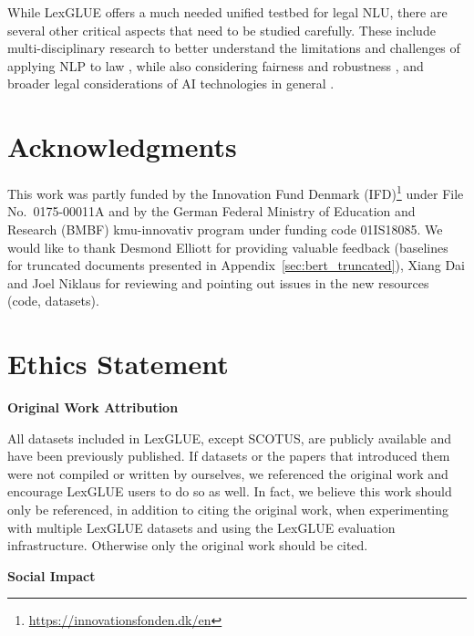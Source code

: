 \documentclass[11pt]{article}
\begin{document}
While LexGLUE offers a much needed unified testbed for legal NLU, there are several other critical aspects that need to be studied carefully. These include multi-disciplinary research to better understand the limitations and challenges of applying NLP to law \cite{Binns_2020}, while also considering fairness and robustness \cite{angwin2016,dressel2018,baker-gillis-2021-sexism,wang-etal-2021-equality,chalkidis-2022-fairlex}, and broader legal considerations of AI technologies in general \cite{schwemer2021,tsarapatsanis-aletras-2021-ethical,Delacroix_2022}.

\section*{Acknowledgments}
This work was partly funded by the Innovation Fund Denmark (IFD)\footnote{\url{https://innovationsfonden.dk/en}} under File No.\ 0175-00011A and by the German Federal Ministry of Education and Research (BMBF) kmu-innovativ program under funding code 01IS18085.
We would like to thank Desmond Elliott for providing valuable feedback (baselines for truncated documents presented in Appendix~\ref{sec:bert_truncated}), Xiang Dai and Joel Niklaus for reviewing and pointing out issues in the new resources (code, datasets). 

\section*{Ethics Statement}

\noindent\textbf{Original Work Attribution}\vspace{1mm}

\noindent All datasets included in LexGLUE, except SCOTUS, are publicly available and have been previously published. If datasets or the papers that introduced them were not compiled or written by ourselves, we referenced the original work and encourage LexGLUE users to do so as well. In fact, we believe this work should only be referenced, in addition to citing the original work, when experimenting with multiple LexGLUE datasets and using the LexGLUE evaluation infrastructure. Otherwise only the original work should be cited.\vspace{2mm}

\noindent\textbf{Social Impact}\vspace{1mm}
\end{document}
